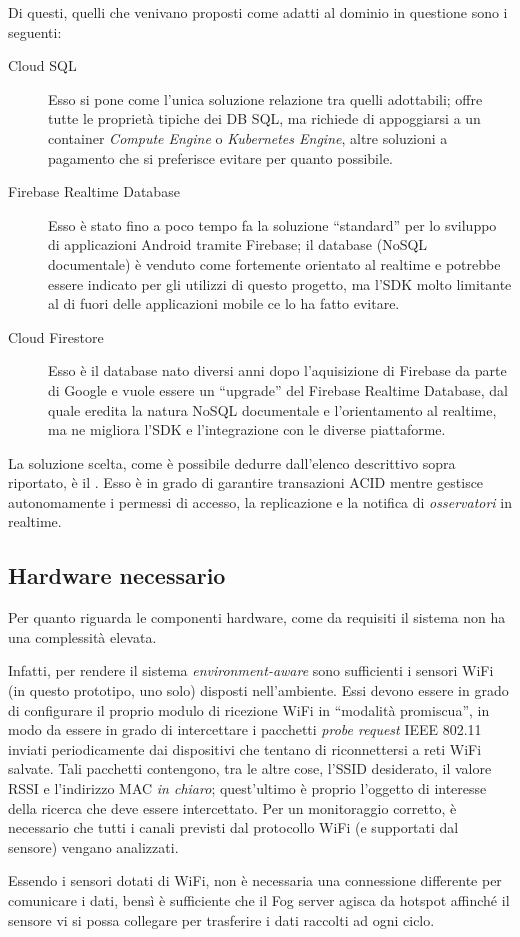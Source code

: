 Di questi, quelli che venivano proposti come adatti al dominio in questione sono i seguenti:

\begin{description}
  \item[Cloud SQL\footnotemark]
    Esso si pone come l'unica soluzione relazione tra quelli adottabili;
    offre tutte le proprietà tipiche dei DB SQL, ma richiede di appoggiarsi a un container \emph{Compute Engine} o \emph{Kubernetes Engine}, altre soluzioni a pagamento che si preferisce evitare per quanto possibile.
  \item[Firebase Realtime Database\footnotemark]
    Esso è stato fino a poco tempo fa la soluzione ``standard'' per lo sviluppo di applicazioni Android tramite Firebase;
    il database (NoSQL documentale) è venduto come fortemente orientato al realtime e potrebbe essere indicato per gli utilizzi di questo progetto, ma l'SDK molto limitante al di fuori delle applicazioni mobile ce lo ha fatto evitare.
  \item[Cloud Firestore\footnotemark]
    Esso è il database nato diversi anni dopo l'aquisizione di Firebase da parte di Google e vuole essere un ``upgrade'' del Firebase Realtime Database, dal quale eredita la natura NoSQL documentale e l'orientamento al realtime, ma ne migliora l'SDK e l'integrazione con le diverse piattaforme.
\end{description}

La soluzione scelta, come è possibile dedurre dall'elenco descrittivo sopra riportato, è il .
Esso è in grado di garantire transazioni ACID mentre gestisce autonomamente i permessi di accesso, la replicazione e la notifica di \emph{osservatori} in realtime.

\subsection{Hardware necessario}

Per quanto riguarda le componenti hardware, come da requisiti il sistema non ha una complessità elevata.

Infatti, per rendere il sistema \emph{environment-aware} sono sufficienti i sensori WiFi (in questo prototipo, uno solo) disposti nell'ambiente.
Essi devono essere in grado di configurare il proprio modulo di ricezione WiFi in ``modalità promiscua'',
in modo da essere in grado di intercettare i pacchetti \emph{probe request} IEEE 802.11 inviati periodicamente dai dispositivi che tentano di riconnettersi a reti WiFi salvate.
Tali pacchetti contengono, tra le altre cose, l'SSID desiderato, il valore RSSI e l'indirizzo MAC \emph{in chiaro};
quest'ultimo è proprio l'oggetto di interesse della ricerca che deve essere intercettato.
Per un monitoraggio corretto, è necessario che tutti i canali previsti dal protocollo WiFi (e supportati dal sensore) vengano analizzati.

Essendo i sensori dotati di WiFi, non è necessaria una connessione differente per comunicare i dati,
bensì è sufficiente che il Fog server agisca da hotspot affinché il sensore vi si possa collegare per trasferire i dati raccolti ad ogni ciclo.
